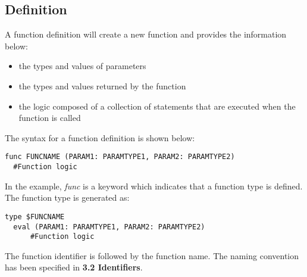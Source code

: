 \documentclass[12pt]{article}
\begin{document}
\subsection{Definition} %
A function definition will create a new function and provides the information below: 
\begin{itemize}
  \item the types and values of parameters
  \item the types and values returned by the function
  \item the logic composed of a collection of statements that are executed when the function is called
\end{itemize}
The syntax for a function definition is shown below:
\begin{lstlisting}[caption=Function Definition]
 func FUNCNAME (PARAM1: PARAMTYPE1, PARAM2: PARAMTYPE2)
  #Function logic
\end{lstlisting}
In the example, \textit{func} is a keyword which indicates that a function type is defined. The function type is generated as:
\begin{lstlisting}[caption=Function Definition]
 type $FUNCNAME
  eval (PARAM1: PARAMTYPE1, PARAM2: PARAMTYPE2)
      #Function logic
\end{lstlisting}
The function identifier is followed by the function name. The naming convention has been specified in \textbf{3.2 Identifiers}.
\end{document}
